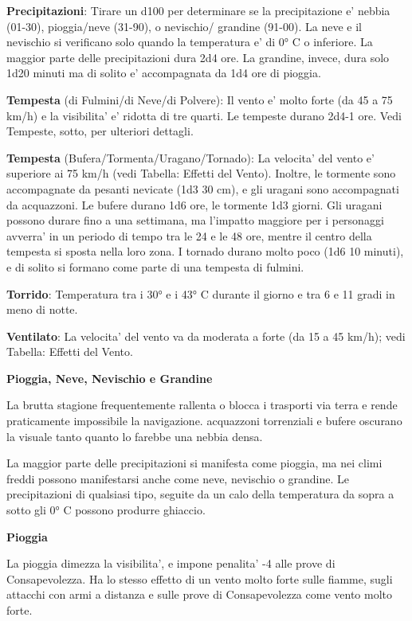 \documentclass[a4paper,11pt,twoside,openany]{book}
\begin{document}
{		\textbf{Precipitazioni}: Tirare un d100 per determinare se la precipitazione e' nebbia (01-30), pioggia/neve (31-90), o nevischio/ grandine (91-00). La neve e il nevischio si verificano solo quando la temperatura e' di 0° C o inferiore. La maggior parte delle precipitazioni dura 2d4 ore. La grandine, invece, dura solo 1d20 minuti ma di solito e' accompagnata da 1d4 ore di pioggia.
		
		\textbf{Tempesta} (di Fulmini/di Neve/di Polvere): Il vento e' molto forte (da 45 a 75 km/h) e la visibilita' e' ridotta di tre quarti. Le tempeste durano 2d4-1 ore. Vedi Tempeste, sotto, per ulteriori dettagli.
		
		\textbf{Tempesta} (Bufera/Tormenta/Uragano/Tornado): La velocita' del vento e' superiore ai 75 km/h (vedi Tabella: Effetti del Vento). Inoltre, le tormente sono accompagnate da pesanti nevicate (1d3 \texttimes{} 30 cm), e gli uragani sono accompagnati da acquazzoni. Le bufere durano 1d6 ore, le tormente 1d3 giorni. Gli uragani possono durare fino a una settimana, ma l'impatto maggiore per i personaggi avverra' in un periodo di tempo tra le 24 e le 48 ore, mentre il centro della tempesta si sposta nella loro zona. I tornado durano molto poco (1d6 \texttimes{} 10 minuti), e di solito si formano come parte di una tempesta di fulmini.
		
		\textbf{Torrido}: Temperatura tra i 30° e i 43° C durante il giorno e tra 6 e 11 gradi in meno di notte.
		
		\textbf{Ventilato}: La velocita' del vento va da moderata a forte (da 15 a 45 km/h); vedi Tabella: Effetti del Vento.
		
		\textbf{Pioggia, Neve, Nevischio e Grandine}
		
		La brutta stagione frequentemente rallenta o blocca i trasporti via terra e rende praticamente impossibile la navigazione. acquazzoni torrenziali e bufere oscurano la visuale tanto quanto lo farebbe una nebbia densa.
		
		La maggior parte delle precipitazioni si manifesta come pioggia, ma nei climi freddi possono manifestarsi anche come neve, nevischio o grandine. Le precipitazioni di qualsiasi tipo, seguite da un calo della temperatura da sopra a sotto gli 0° C possono produrre ghiaccio.
		
		\textbf{Pioggia}
		
		La pioggia dimezza la visibilita', e impone penalita' -4 alle prove di Consapevolezza. Ha lo stesso effetto di un vento molto forte sulle fiamme, sugli attacchi con armi a distanza e sulle prove di Consapevolezza come vento molto forte.
		
}
\end{document}
